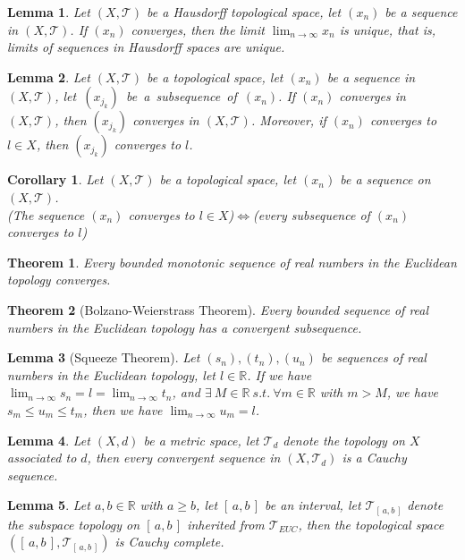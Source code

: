 \documentclass[11pt]{article}
\theoremstyle{break}
\theoremstyle{break}
\newtheorem{thm}{Theorem}[section]
\newtheorem{lem}{Lemma}[thm]
\newtheorem{corL}{Corollary}[lem]
\newcommand{\R}{\mathbb{R}}
\newcommand{\T}{\mathcal{T}}
\newcommand{\Intab}{[\,a,b\,]}
\begin{document}
	\begin{lem}
		Let $(X,\T)$ be a Hausdorff topological space, let $(x_n)$ be a sequence in $(X,\T)$. If $(x_n)$ converges, then the limit $\lim_{n \to \infty} x_n$ is unique, that is, limits of sequences in Hausdorff spaces are unique.
	\end{lem}
		
	\begin{lem}
		Let $(X,\T)$ be a topological space, let $(x_n)$ be a sequence in $(X,\T)$, \mbox{let $(x_{j_k})$ be a subsequence of $(x_n)$.} If $(x_n)$ converges in $(X,\T)$, then $(x_{j_k})$ converges in $(X,\T)$. Moreover, if $(x_n)$ converges to $l \in X$, then $(x_{j_k})$ converges to $l$.
	\end{lem}
	
	\begin{corL}
		Let $(X,\T)$ be a topological space, let $(x_n)$ be a sequence on $(X,\T)$.\\(The sequence $(x_n)$ converges to $l \in X$)$\iff$(every subsequence of  $(x_n)$ converges to $l$)
	\end{corL}
	
	\begin{thm}
		Every bounded monotonic sequence of real numbers in the Euclidean topology converges.
	\end{thm}
	
	\begin{thm}[Bolzano-Weierstrass Theorem]
		Every bounded sequence of real numbers in the Euclidean topology has a convergent subsequence.
	\end{thm}

	\begin{lem}[Squeeze Theorem]
		Let $(s_n),(t_n),(u_n)$ be sequences of real numbers in the Euclidean topology, let $l \in \R$. If we have $\lim_{n \to \infty} s_n =l = \lim_{n \to \infty}t_n$, and $\exists \ M \in \R \ s.t. \ \forall m \in \R$ with $m>M$, we have $s_m \leq u_m \leq t_m$, then we have $\lim_{n \to \infty} u_m = l$.
	\end{lem}
	
	\begin{lem}
		Let $(X,d)$ be a metric space, let $\T_d$ denote the topology on $X$ associated to $d$, then every convergent sequence in $(X,\T_d)$ is a Cauchy sequence.
	\end{lem}
	
	\begin{lem}
		Let $a,b \in \R$ with $a \geq b$, let $\Intab$ be an interval, let $\T_{\Intab}$ denote the subspace topology on $\Intab$ inherited from $\T_{EUC}$, then the topological space $(\Intab, \T_{\Intab})$ is Cauchy complete.
	\end{lem}
	
\end{document}
